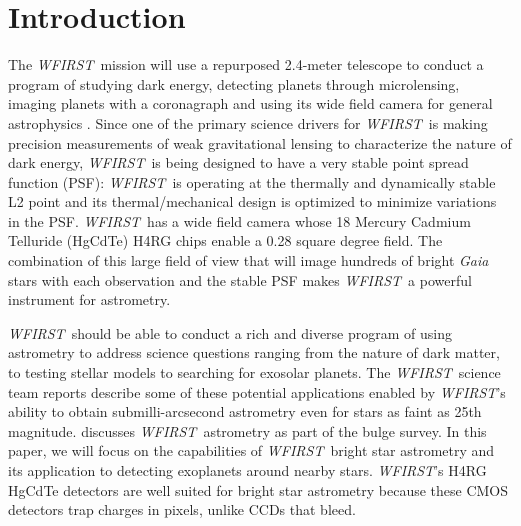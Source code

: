 \documentclass[modern, times]{aastex61}
\newcommand\wfirst{\textit{WFIRST}}
\newcommand\gaia{\textit{Gaia}}
\begin{document}


\section{Introduction}

The \wfirst\ mission will use a repurposed 2.4-meter telescope to conduct a program of studying dark energy, detecting planets through microlensing, imaging planets with a coronagraph and using its
wide field camera for general astrophysics \citep{Spergel2013,Spergel2015}.   Since one of the primary science drivers for \wfirst\ is making precision measurements of weak gravitational lensing to characterize 
the nature of dark energy, \wfirst\ is being designed to have a very stable point spread function (PSF): \wfirst\ is operating at the thermally and dynamically stable L2 point and its thermal/mechanical design is optimized to 
minimize variations in the PSF.  \wfirst\ has a wide field camera whose 18 Mercury Cadmium Telluride (HgCdTe) H4RG chips enable a 0.28 square degree field.  The combination of this large field of view that will image hundreds of bright 
\gaia\ \citep{Gaia2016} stars with each observation and the stable PSF makes \wfirst\ a powerful instrument for astrometry.

\wfirst\ should be able to conduct a rich and diverse program of using astrometry to address science questions ranging from the nature of dark matter, to testing stellar models to searching for exosolar planets. 
The \wfirst\ science team reports \citep{Spergel2013,Spergel2015} describe some of these potential applications enabled by \wfirst's ability to obtain submilli-arcsecond astrometry even for stars as faint as 25th magnitude. 
\citet[later G15]{Gould2015} discusses \wfirst\ astrometry as part of the bulge survey.
In this paper, we will focus on the capabilities of \wfirst\ bright star astrometry and its application to detecting exoplanets around nearby stars.   \wfirst's
H4RG HgCdTe  detectors are well suited for bright star astrometry because these CMOS detectors trap charges in pixels, unlike CCDs that bleed.
\end{document}
